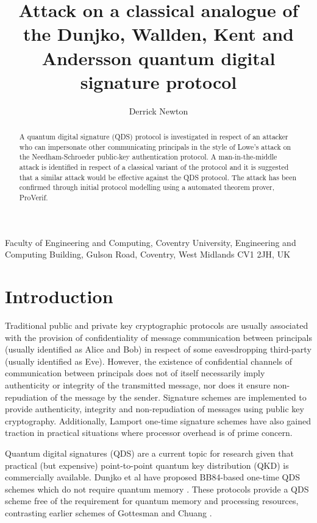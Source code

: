 \documentclass[english]{article}
\begin{document}
\title{Attack on a classical analogue of the Dunjko, Wallden, Kent and Andersson
quantum digital signature protocol}


\author{Derrick Newton}

\maketitle
Faculty of Engineering and Computing, Coventry University, Engineering
and Computing Building, Gulson Road, Coventry, West Midlands CV1 2JH,
UK
\begin{abstract}
A quantum digital signature (QDS) protocol is investigated in respect
of an attacker who can impersonate other communicating principals
in the style of Lowe's attack on the Needham-Schroeder public-key
authentication protocol. A man-in-the-middle attack is identified
in respect of a classical variant of the protocol and it is suggested
that a similar attack would be effective against the QDS protocol.
The attack has been confirmed through initial protocol modelling using
a automated theorem prover, ProVerif.
\end{abstract}

\section{Introduction}

Traditional public and private key cryptographic protocols are usually
associated with the provision of confidentiality of message communication
between principals (usually identified as Alice and Bob) in respect
of some eavesdropping third-party (usually identified as Eve). However,
the existence of confidential channels of communication between principals
does not of itself necessarily imply authenticity or integrity of
the transmitted message, nor does it ensure non-repudiation of the
message by the sender. Signature schemes are implemented to provide
authenticity, integrity and non-repudiation of messages using public
key cryptography. Additionally, Lamport one-time signature schemes
\cite{Lamport1979} have also gained traction in practical situations
where processor overhead is of prime concern.

Quantum digital signatures (QDS) are a current topic for research
given that practical (but expensive) point-to-point quantum key distribution
(QKD) is commercially available. Dunjko et al have proposed BB84-based
one-time QDS schemes which do not require quantum memory \cite{Dunjko2014,Dunjko2014a}.
These protocols provide a QDS scheme free of the requirement for quantum
memory and processing resources, contrasting earlier schemes of Gottesman
and Chuang \cite{Gottesman2001}.
\end{document}
